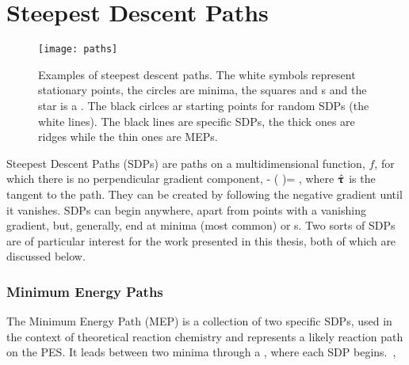 \section{Steepest Descent Paths}
\label{sec:sdps}

\begin{figure}[h]
  \begin{center}
    \texttt{[image: paths]}
    \parbox{0.85\linewidth}{
      \caption{Examples of steepest descent paths.
The white symbols represent stationary points, the circles are minima, the squares and s and the star is a .
The black cirlces ar starting points for random SDPs (the white lines).
The black lines are specific SDPs, the thick ones are ridges while the thin ones are MEPs.
      }
      \label{fig:paths}
    }
  \end{center}
\end{figure}

Steepest Descent Paths (SDPs) are paths on a multidimensional function, $f$, for which there is no perpendicular gradient component,
\nabla {} - (\nabla {} \cdot \uvt)\uvt = ,
\eeq
where $\hat{{\mathrm{\mathbf{\bm{\uptau}}}}}$ is the tangent to the path.
They can be created by following the negative gradient until it vanishes.
SDPs can begin anywhere, apart from points with a vanishing gradient, but, generally, end at minima (most common) or \sap{}s.
Two sorts of SDPs are of particular interest for the work presented in this thesis, both of which are discussed below.


\subsubsection{Minimum Energy Paths}


The Minimum Energy Path (MEP) is a collection of two specific SDPs, used in the context of theoretical reaction chemistry and represents a likely reaction path on the PES.
It leads between two minima through a , where each SDP begins.~\cite{neb-polemic-henkelman1},

